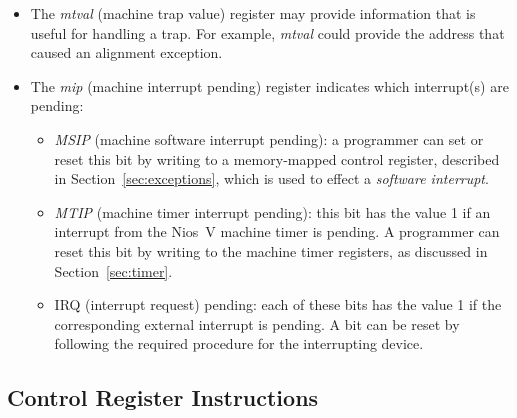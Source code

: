\documentclass[11pt, twoside, pdftex]{article}
\begin{document}
\begin{itemize}
\begin{itemize}
interrupts, this field gives the IRQ number of the interrupting device.
\end{itemize}
\item The {\it mtval} (machine trap value) register may provide information that is useful 
for handling a trap. For example, {\it mtval} could provide the address that caused an 
alignment exception.
\item The {\it mip} (machine interrupt pending) register indicates which interrupt(s) are 
pending: 
\begin{itemize}
\item {\it MSIP} (machine software interrupt pending): a programmer can set or reset this
bit by writing to a memory-mapped control register, described in Section~\ref{sec:exceptions}, 
which is used to effect a {\it software interrupt}.
\item {\it MTIP} (machine timer interrupt pending): this bit has the value 1 
if an interrupt from the Nios~V machine timer is pending. A programmer can reset this bit 
by writing to the machine timer registers, as discussed in Section~\ref{sec:timer}.
\item IRQ (interrupt request) pending: each of these bits has the value 1 if the
corresponding external interrupt is pending. 
A bit can be reset by following the required procedure for the
interrupting device. 
\end{itemize}
\end{itemize}
 
\subsection{Control Register Instructions}
\label{sec:csr_inst}
\end{document}
